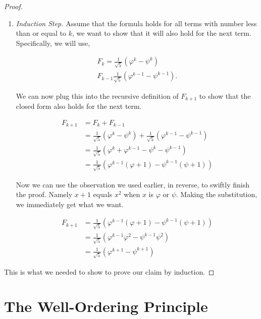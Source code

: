 \begin{proof}
\begin{enumerate}
		\item \emph{Induction Step.} Assume that the formula holds for all terms with number less than or equal to $k$, we want to show that it will also hold for the next term. Specifically, we will use,
		
		\begin{align*}
			F_k = \frac{1}{\sqrt{5}} \left( \varphi^k - \psi^k \right) \\
			F_{k - 1} \frac{1}{\sqrt{5}} \left( \varphi^{k - 1} - \psi^{k - 1} \right).
		\end{align*}
		
		We can now plug this into the recursive definition of $F_{k + 1}$ to show that the closed form also holds for the next term.
		
		\begin{align*}
			F_{k + 1} &= F_k + F_{k - 1} \\
			&= \frac{1}{\sqrt{5}} \left( \varphi^k - \psi^k \right) +\frac{1}{\sqrt{5}} \left( \varphi^{k - 1} - \psi^{k - 1} \right) \\
			&= \frac{1}{\sqrt{5}} \left( \varphi^k + \varphi^{k - 1} - \psi^k - \psi^{k - 1} \right) \\
			&= \frac{1}{\sqrt{5}} \left( \varphi^{k - 1} (\varphi + 1) - \psi^{k - 1} (\psi + 1) \right)
		\end{align*}
		
		Now we can use the observation we used earlier, in reverse, to swiftly finish the proof. Namely $x + 1$ equals $x^2$ when $x$ is $\varphi$ or $\psi$. Making the substitution, we immediately get what we want.
		
		\begin{align*}
			F_{k + 1} &= \frac{1}{\sqrt{5}} \left( \varphi^{k - 1} (\varphi + 1) - \psi^{k - 1} (\psi + 1) \right) \\
			&= \frac{1}{\sqrt{5}} \left( \varphi^{k - 1} \varphi^2 - \psi^{k - 1} \psi^2 \right) \\
			&= \frac{1}{\sqrt{5}} \left( \varphi^{k + 1} - \psi^{k + 1} \right)
		\end{align*}
	\end{enumerate}
	This is what we needed to show to prove our claim by induction.
\end{proof}
\vspace{\baselineskip}

\section{The Well-Ordering Principle}

